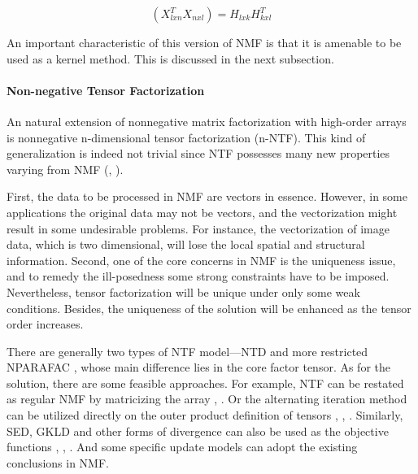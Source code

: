 \documentclass[letterpaper,12pt]{article}
\begin{document}
\begin{equation}
(X_{lxn}^{T}X_{nxl})=H_{lxk}H_{kxl}^{T}\label{eq:symmetric-nmf}
\end{equation}

An important characteristic of this version of NMF is that it is amenable to be used as a kernel method. This is discussed in the next subsection.

\paragraph{Non-negative Tensor Factorization}%


An natural extension of nonnegative matrix factorization with high-order arrays is nonnegative n-dimensional tensor factorization (n-NTF). This kind of generalization is indeed not trivial since NTF possesses many new properties varying from NMF (\cite{Hazan2005}, \cite{Morup2008}).  

First, the data to be processed in NMF are vectors in essence. However, in some applications the original data may not be vectors, and the vectorization might result in some undesirable problems. For instance, the vectorization of image data, which is two dimensional, will lose the local spatial and structural information. Second, one of the core concerns in NMF is the uniqueness issue, and to remedy the ill-posedness some strong constraints have to be imposed. Nevertheless, tensor factorization will be unique under only some weak conditions. Besides, the uniqueness of the solution will be enhanced as the tensor order increases\cite{Wang2013}.

There are generally two types of NTF model—NTD \cite{Morup2008} and more restricted NPARAFAC \cite{Hazan2005}, whose main difference lies in the core factor tensor. As for the solution, there are some feasible approaches. For example, NTF can be restated as regular NMF by matricizing the array \cite{Welling2001}, \cite{Morup2008}. Or the alternating iteration method can be utilized directly on the outer product definition of tensors \cite{Hazan2005}, \cite{Shashua2005}, \cite{Benetos2010}. Similarly, SED, GKLD and other forms of divergence can also be used as the objective functions \cite{Benetos2010}, \cite{Cichocki2007}, \cite{Zafeiriou2011}. And some specific update models can adopt the existing conclusions in NMF. %
\end{document}
